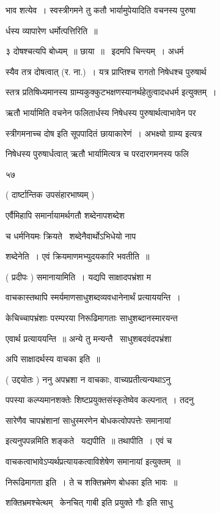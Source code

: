 \documentclass[11pt, openany]{book}
\begin{document}
भाव शत्येव~। स्वस्त्रीगमने तु कतौ भार्यामुपेयादिति वचनस्य पुरुषा \textendash\ 

र्धस्य व्यापारेण धर्मोत्पत्तिरिति~॥ 

३ दोषश्चत्यपि बोध्यम्~॥ छाया~॥ \textendash\ इदमपि चिन्त्यम्~। अधर्म \textendash\ 

स्यैव तत्र दोषत्वात् (र. ना.)~। यत्र प्राप्तिश्च रागतो निषेधश्च
पुरुषार्थ \textendash\ 

स्तत्र प्रतिषिध्यमानस्य ग्राम्यकुक्कुटभक्षणस्यानर्थहेतुत्वादधधर्म
इत्युक्तम्~। 

ऋतौ भार्यामिति वचनेन फलितार्धस्य निषेधस्य पुरुषार्थत्वाभावेन पर \textendash\ 

स्त्रीगमनाच्च दोष इति सूपपादितं छायाकारेणं~। अभक्ष्यो ग्राम्य इत्यत्र 

निषेधस्य पुरुषार्धत्वात् ऋतौ भार्यामित्यत्र च परदारगमनस्य फलि \textendash\ 





५७ 

( दार्ष्टान्तिक उपसंहारभाष्यम् ) 

एर्वैमिहापि समार्नायामर्थगतौ शब्देनापशब्देश 

च धर्मनियमः क्रियते \textendash\ शब्देनैवार्थोऽभिधेयो नाप \textendash\ 

शब्देनेति~। एवं क्रियमाणमभ्युदयकारि भवतीति~॥ 

( प्रदीपः ) समानायामिति~। यद्यपि साक्षादपभ्रंशा म 

वाचकास्तथापि स्मर्यमाणसाधुशब्दव्यवधानेनार्थं प्रत्याययन्ति~। 

केचिच्चापभ्रंशाः परम्परया निरूढिमागताः साधुशब्दानस्मारयन्त 

एवार्थ प्रत्याययन्ति~॥ अन्ये तु मन्यन्तै \textendash\ साधुशबदवंदपभ्रंशा 

अपि साक्षादर्थस्य वाचका इति~॥ 

( उद्दयोतः ) ननु अपभ्रशा न वाचकाः, वाच्यप्रतीत्यन्यथाऽनु \textendash\ 

पपस्या कल्प्यमानशक्तेः शिष्टप्रयुक्तसंस्कृतेष्वेव कल्पनात्~। तदनु \textendash\ 

सारेणैव चापभ्रंशानां साधुस्मरणेन बोधकत्वोपपत्तेः {\qt समानायां} 

इत्यनुपपन्नमिति शङ्कते \textendash\ यद्यपीति~॥ तथापीति~। एवं च 

वाचकत्वाभावेऽप्यर्थप्रत्यायकत्वाविशेषेण {\qt समानायां} इत्युक्तम्~॥ 

निरूढिमागता इति~। ते च शक्तिभ्रमेण बोधका इति भावः~॥ 

शक्तिभ्रमश्चेत्थम् \textendash\ केनचित् {\qt गाबी} इति प्रयुक्ते {\qt गौः इति साधु} \textendash\ 
\end{document}

